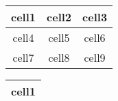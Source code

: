 \documentclass{article}
\begin{document}
\begin{center}
\begin{tabular}{ |c|c|c| } 
 \hline
 cell1 & cell2 & cell3 \\
 \hline
 cell4 & cell5 & cell6 \\ 
 \hline
 cell7 & cell8 & cell9 \\ 
 \hline
\end{tabular}
\end{center}


\begin{center}
\begin{tabular}{ |c| } 
 \hline
 cell1 \\
 \hline

\end{tabular}
\end{center}

\end{document}
